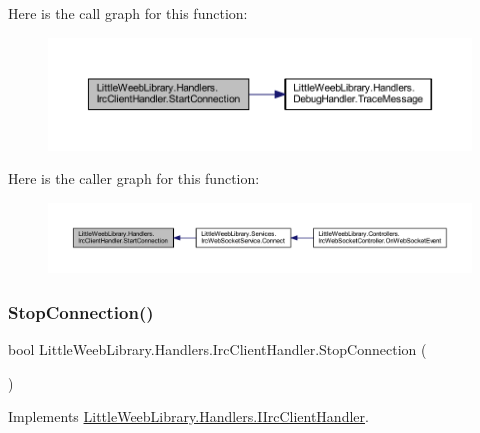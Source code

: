 Here is the call graph for this function\+:\nopagebreak
\begin{figure}[H]
\begin{center}
\leavevmode
\includegraphics[width=350pt]{class_little_weeb_library_1_1_handlers_1_1_irc_client_handler_ae463832b8e9aea73f26ed6188a14d92e_cgraph}
\end{center}
\end{figure}
Here is the caller graph for this function\+:\nopagebreak
\begin{figure}[H]
\begin{center}
\leavevmode
\includegraphics[width=350pt]{class_little_weeb_library_1_1_handlers_1_1_irc_client_handler_ae463832b8e9aea73f26ed6188a14d92e_icgraph}
\end{center}
\end{figure}
\mbox{\label{class_little_weeb_library_1_1_handlers_1_1_irc_client_handler_a97a617b50a161906a91ce1ea483a1770}} 
\subsubsection{\texorpdfstring{Stop\+Connection()}{StopConnection()}}
{\footnotesize\ttfamily bool Little\+Weeb\+Library.\+Handlers.\+Irc\+Client\+Handler.\+Stop\+Connection (\begin{DoxyParamCaption}{ }\end{DoxyParamCaption})}



Implements \mbox{\hyperlink{interface_little_weeb_library_1_1_handlers_1_1_i_irc_client_handler_a2b673db5262a09a26d72ee57e34e5b60}{Little\+Weeb\+Library.\+Handlers.\+I\+Irc\+Client\+Handler}}.



